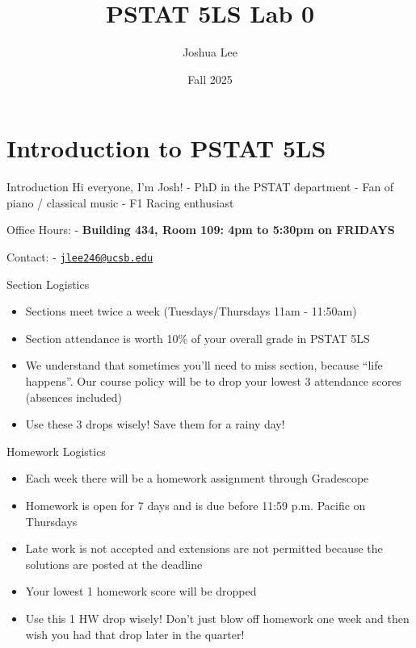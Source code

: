 \documentclass[
  ignorenonframetext,
]{beamer}
\title{PSTAT 5LS Lab 0}
\author{Joshua Lee}
\date{Fall 2025}
\providecommand{\tightlist}{%
  \setlength{\itemsep}{0pt}\setlength{\parskip}{0pt}}
\begin{document}
\frame{\titlepage}

\section{Introduction to PSTAT 5LS}\label{introduction-to-pstat-5ls}

\begin{frame}{Introduction}
\label{introduction}
Hi everyone, I'm Josh! - PhD in the PSTAT department - Fan of piano /
classical music - F1 Racing enthusiast

Office Hours: - \textbf{Building 434, Room 109: 4pm to 5:30pm on
FRIDAYS}

Contact: - \href{mailto:jlee246@ucsb.edu}{\nolinkurl{jlee246@ucsb.edu}}
\end{frame}

\begin{frame}{Section Logistics}
\label{section-logistics}
\begin{itemize}
\tightlist
\item
  Sections meet twice a week (Tuesdays/Thursdays 11am - 11:50am)
\item
  Section attendance is worth 10\% of your overall grade in PSTAT 5LS
\item
  We understand that sometimes you'll need to miss section, because
  ``life happens''. Our course policy will be to drop your lowest 3
  attendance scores (absences included)
\item
  Use these 3 drops wisely! Save them for a rainy day!
\end{itemize}
\end{frame}

\begin{frame}{Homework Logistics}
\label{homework-logistics}
\begin{itemize}
\tightlist
\item
  Each week there will be a homework assignment through Gradescope
\item
  Homework is open for 7 days and is due before 11:59 p.m. Pacific on
  Thursdays
\item
  Late work is not accepted and extensions are not permitted because the
  solutions are posted at the deadline
\item
  Your lowest 1 homework score will be dropped
\item
  Use this 1 HW drop wisely! Don't just blow off homework one week and
  then wish you had that drop later in the quarter!
\end{itemize}
\end{frame}
\end{document}
